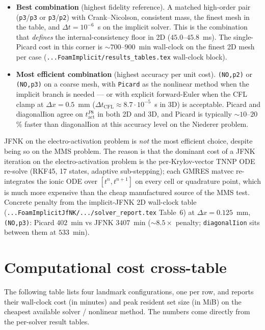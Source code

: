 \documentclass[11pt,a4paper]{article}
\newcommand{\tact}{t_{\text{act}}^{P8}}
\newcommand{\code}[1]{\texttt{\small #1}}
\begin{document}
\begin{itemize}[leftmargin=*]
\item \textbf{Best combination} (highest fidelity reference). A matched
high-order pair (\code{p3}/\code{p3} or \code{p3}/\code{p2}) with
Crank--Nicolson, consistent mass, the finest mesh in the table, and
$\Delta t = 10^{-6}$~s on the implicit solver. This is the
combination that \emph{defines} the internal-consistency floor in 2D
($45.0$--$45.8$~ms). The single-Picard cost in this corner is
$\sim 700$--$900$~min wall-clock on the finest 2D mesh per case
(\code{...FoamImplicit/results\_tables.tex} wall-clock block).
\item \textbf{Most efficient combination} (highest accuracy per unit
cost). \code{(NO,p2)} or \code{(NO,p3)} on a coarse mesh, with
\code{Picard} as the nonlinear method when the implicit branch is
needed --- or with explicit forward-Euler when the CFL clamp at
$\Delta x = 0.5$~mm ($\Delta t_{\text{CFL}} \approx 8.7\!\cdot\!10^{-5}$~s
in 3D) is acceptable. Picard and diagonalIion agree on $\tact$ in
both 2D and 3D, and Picard is typically $\sim 10$--$20$\% faster
than diagonalIion at this accuracy level on the Niederer problem.
\end{itemize}

JFNK on the electro-activation problem is \emph{not} the most
efficient choice, despite being so on the MMS problem. The reason is
that the dominant cost of a JFNK iteration on the electro-activation
problem is the per-Krylov-vector TNNP ODE re-solve (RKF45, 17 states,
adaptive sub-stepping); each GMRES matvec re-integrates the ionic ODE
over $[t^n, t^{n+1}]$ on every cell or quadrature point, which is
much more expensive than the cheap manufactured source of the MMS
test. Concrete penalty from the implicit-JFNK 2D wall-clock table
(\code{...FoamImplicitJfNK/.../solver\_report.tex} Table~6) at
$\Delta x = 0.125$~mm, \code{(NO,p3)}: Picard
$402$~min vs JFNK $3407$~min (\textbf{$\sim 8.5\times$} penalty;
\code{diagonalIion} sits between them at $533$~min).

\section{Computational cost cross-table}
\label{sec:cost}

The following table lists four landmark configurations, one per row,
and reports their wall-clock cost (in minutes) and peak resident set
size (in MiB) on the cheapest available solver / nonlinear method.
The numbers come directly from the per-solver result tables.
\end{document}
